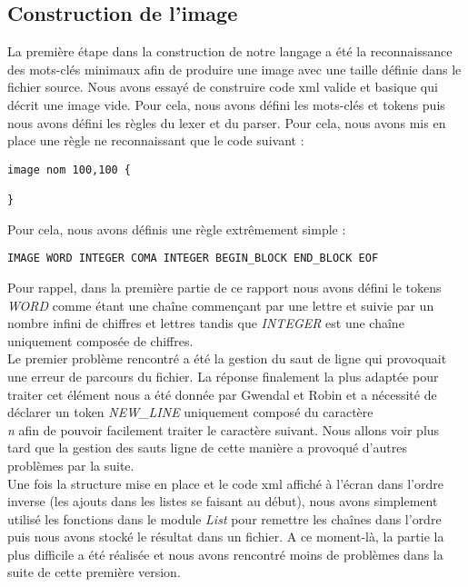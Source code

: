		\subsection{Construction de l'image}
			La première étape dans la construction de notre langage a été la reconnaissance des mots-clés minimaux afin de produire une image avec une taille définie dans le fichier source. Nous avons essayé de construire code xml valide et basique qui décrit une image vide. Pour cela, nous avons défini les mots-clés et tokens puis nous avons défini les règles du lexer et du parser. Pour cela, nous avons mis en place une règle ne reconnaissant que le code suivant : 
\begin{lstlisting}[morekeywords={image}]
image nom 100,100 {

}
\end{lstlisting}
		
		Pour cela, nous avons définis une règle extrêmement simple : 
		
\begin{lstlisting}[morekeywords={IMAGE,WORD,INTEGER,COMA,BEGIN_BLOCK,END_BLOCK,EOF}]
IMAGE WORD INTEGER COMA INTEGER BEGIN_BLOCK END_BLOCK EOF
\end{lstlisting}
		
		Pour rappel, dans la première partie de ce rapport nous avons défini le tokens \emph{WORD} comme étant une chaîne commençant par une lettre et suivie par un nombre infini de chiffres et lettres tandis que \emph{INTEGER} est une chaîne uniquement composée de chiffres.\\
		
		Le premier problème rencontré a été la gestion du saut de ligne qui provoquait une erreur de parcours du fichier. La réponse finalement la plus adaptée pour traiter cet élément nous a été donnée par Gwendal et Robin et a nécessité de déclarer un token \emph{NEW\_LINE} uniquement composé du caractère \emph{\\n} afin de pouvoir facilement traiter le caractère suivant. Nous allons voir plus tard que la gestion des sauts ligne de cette manière a provoqué d'autres problèmes par la suite. \\
		
		Une fois la structure mise en place et le code xml affiché à l'écran dans l'ordre inverse (les ajouts dans les listes se faisant au début), nous avons simplement utilisé les fonctions dans le module \emph{List} pour remettre les chaînes dans l'ordre puis nous avons stocké le résultat dans un fichier. A ce moment-là, la partie la plus difficile a été réalisée et nous avons rencontré moins de problèmes dans la suite de cette première version.
		
